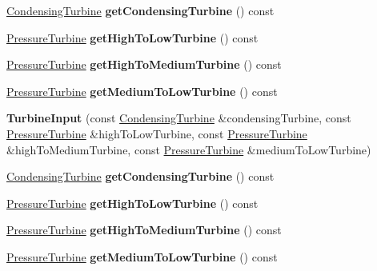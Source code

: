 \begin{DoxyCompactItemize}
\item 
\mbox{\label{class_turbine_input_a27fb20f2b3924fd8da72e975641973fe}} 
\hyperlink{class_condensing_turbine}{Condensing\+Turbine} {\bfseries get\+Condensing\+Turbine} () const
\item 
\mbox{\label{class_turbine_input_a0292abe52145b140ab3de9fc24f59df8}} 
\hyperlink{class_pressure_turbine}{Pressure\+Turbine} {\bfseries get\+High\+To\+Low\+Turbine} () const
\item 
\mbox{\label{class_turbine_input_ae3e5edc47142a9567e14632fb56f578c}} 
\hyperlink{class_pressure_turbine}{Pressure\+Turbine} {\bfseries get\+High\+To\+Medium\+Turbine} () const
\item 
\mbox{\label{class_turbine_input_ab7ead42f7d2d296868ccf43d1beff56b}} 
\hyperlink{class_pressure_turbine}{Pressure\+Turbine} {\bfseries get\+Medium\+To\+Low\+Turbine} () const
\item 
\mbox{\label{class_turbine_input_a0d7992d1f976498938f5db9db4aedda0}} 
{\bfseries Turbine\+Input} (const \hyperlink{class_condensing_turbine}{Condensing\+Turbine} \&condensing\+Turbine, const \hyperlink{class_pressure_turbine}{Pressure\+Turbine} \&high\+To\+Low\+Turbine, const \hyperlink{class_pressure_turbine}{Pressure\+Turbine} \&high\+To\+Medium\+Turbine, const \hyperlink{class_pressure_turbine}{Pressure\+Turbine} \&medium\+To\+Low\+Turbine)
\item 
\mbox{\label{class_turbine_input_a27fb20f2b3924fd8da72e975641973fe}} 
\hyperlink{class_condensing_turbine}{Condensing\+Turbine} {\bfseries get\+Condensing\+Turbine} () const
\item 
\mbox{\label{class_turbine_input_a0292abe52145b140ab3de9fc24f59df8}} 
\hyperlink{class_pressure_turbine}{Pressure\+Turbine} {\bfseries get\+High\+To\+Low\+Turbine} () const
\item 
\mbox{\label{class_turbine_input_ae3e5edc47142a9567e14632fb56f578c}} 
\hyperlink{class_pressure_turbine}{Pressure\+Turbine} {\bfseries get\+High\+To\+Medium\+Turbine} () const
\item 
\mbox{\label{class_turbine_input_ab7ead42f7d2d296868ccf43d1beff56b}} 
\hyperlink{class_pressure_turbine}{Pressure\+Turbine} {\bfseries get\+Medium\+To\+Low\+Turbine} () const
\end{DoxyCompactItemize}
